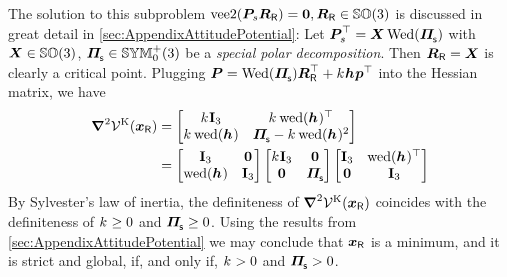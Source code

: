 The solution to this subproblem $\operatorname{vee2}(\boldsymbol{P}_{\!s} \boldsymbol{R}_{\mathsf{R}}) = \boldsymbol{0}, \boldsymbol{R}_{\mathsf{R}}\in\mathbb{SO}(3)$ is discussed in great detail in \autoref{sec:AppendixAttitudePotential}:
Let $\mat{P}_{\!s}^\top = \mat{X} \wedMatOp(\bodyMOSs{}{})$ with $\boldsymbol{X}\in\mathbb{SO}(3)$, $\bodyMOSs{}{}\in\SymMatSP(3)$ be a \textit{special polar decomposition}.
Then $\boldsymbol{R}_{\mathsf{R}} = \boldsymbol{X}$ is clearly a critical point.
Plugging $\mat{P} = \wedMatOp(\bodyMOSs{}{}) \RR^\top + \bodyStiffness{}{}\bodyCOS{}{}\tuple{p}^\top$ into the Hessian matrix, we have
\begin{align}
 \differential^2 \potentialStiff(\sysCoordR) 
 &= \begin{bmatrix} \bodyStiffness{}{} \idMat[3] & \bodyStiffness{}{}\wedOp(\bodyCOS{}{})^\top \\ \bodyStiffness{}{}\wedOp(\bodyCOS{}{}) & \bodyMOSs{}{} - \bodyStiffness{}{} \wedOp(\bodyCOS{}{})^2 \end{bmatrix}
\nonumber\\
 &= \begin{bmatrix} \idMat[3] & \mat{0} \\ \wedOp(\bodyCOS{}{}) & \idMat[3] \end{bmatrix}
 \begin{bmatrix} 
  \bodyStiffness{}{} \idMat[3] & \mat{0} \\
  \mat{0} & \bodyMOSs{}{}
 \end{bmatrix}
 \begin{bmatrix} \idMat[3] & \wedOp(\bodyCOS{}{})^\top \\ \mat{0} & \idMat[3] \end{bmatrix}
\end{align}
By Sylvester's law of inertia, the definiteness of $\boldsymbol{\nabla}^2 \mathcal{V}^{\mathrm{K}}(\boldsymbol{x}_{\mathsf{R}})$ coincides with the definiteness of $\bodyStiffness{}{} \geq 0$ and $\bodyMOSs{}{} \geq 0$.
Using the results from \autoref{sec:AppendixAttitudePotential} we may conclude that $\boldsymbol{x}_{\mathsf{R}}$ is a minimum, and it is strict and global, if, and only if, $\bodyStiffness{}{} > 0$ and $\bodyMOSs{}{} > 0$.

